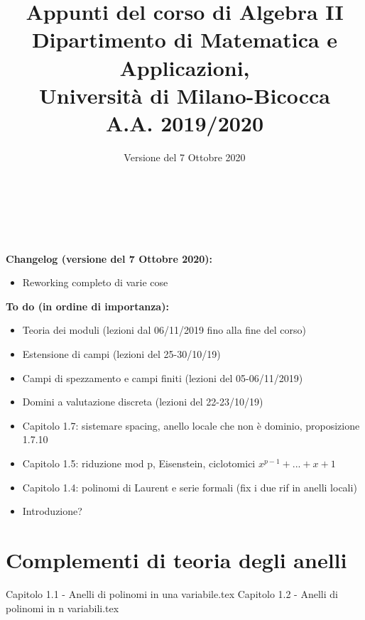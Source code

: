 \documentclass{article}
\begin{document}
\AddToShipoutPicture*{\BackgroundPic}

\title{\Huge{\textbf{Appunti del corso di Algebra II}} \\ \vspace{3mm}
	   \LARGE{\textbf{Dipartimento di Matematica e Applicazioni,}} \\ 
	   \LARGE{\textbf{Università di Milano-Bicocca}} \\ \vspace{3mm}
	   \Large{\textbf{A.A. 2019/2020}} %
	   }
\author{Versione del 7 Ottobre 2020}
\date{}

\maketitle
\thispagestyle{empty}
\clearpage

\tableofcontents

\

\

\noindent \textbf{Changelog (versione del 7 Ottobre 2020):}
\begin{itemize}
\item Reworking completo di varie cose
\end{itemize}

\noindent \textbf{To do (in ordine di importanza):}
\begin{itemize}
\item Teoria dei moduli (lezioni dal 06/11/2019 fino alla fine del corso)
\item Estensione di campi (lezioni del 25-30/10/19)
\item Campi di spezzamento e campi finiti (lezioni del 05-06/11/2019)
\item Domini a valutazione discreta (lezioni del 22-23/10/19)
\item Capitolo 1.7: sistemare spacing, anello locale che non è dominio, proposizione 1.7.10
\item Capitolo 1.5: riduzione mod p, Eisenstein, ciclotomici $x^{p-1}+...+x+1$
\item Capitolo 1.4: polinomi di Laurent e serie formali (fix i due rif in anelli locali)
\item Introduzione?
\end{itemize}
\clearpage

\section{Complementi di teoria degli anelli}
{Capitolo 1.1 - Anelli di polinomi in una variabile.tex}
{Capitolo 1.2 - Anelli di polinomi in n variabili.tex}
\end{document}
